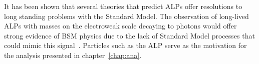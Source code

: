It has been shown that several theories that predict ALPs offer resolutions to long standing problems with the Standard Model. The observation of long-lived ALPs with masses on the electroweak scale decaying to photons would offer strong evidence of BSM physics due to the lack of Standard Model processes that could mimic this signal~\cite{Curtin_2014}. Particles such as the ALP serve as the motivation for the analysis presented in chapter~\ref{chap:ana}.